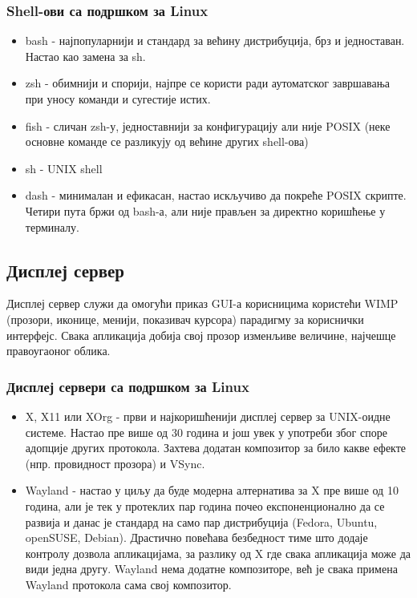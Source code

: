 \documentclass[a4paper,14pt]{article}
\begin{document}
\subsubsection{Shell-ови са подршком за Linux}
\begin{itemize}
\item bash - најпопуларнији и стандард за већину дистрибуција, брз и једноставан. Настао као замена за sh.
\item zsh - обимнији и спорији, најпре се користи ради аутоматског завршавања при уносу команди и сугестије истих.
\item fish - сличан zsh-у, једноставнији за конфигурацију али није POSIX (неке основне команде се разликују од већине других shell-ова)
\item sh - UNIX shell
\item dash - минималан и ефикасан, настао искључиво да покреће POSIX скрипте. Четири пута бржи од bash-а, али није прављен за директно коришћење у терминалу.
\end{itemize}

\subsection{Дисплеј сервер}
Дисплеј сервер служи да омогући приказ GUI-а корисницима користећи WIMP (прозори, иконице, менији, показивач курсора) парадигму за кориснички интерфејс. Свака апликација добија свој прозор изменљиве величине, најчешце правоугаоног облика.
\subsubsection{Дисплеј сервери са подршком за Linux}
\begin{itemize}
\item X, X11 или XOrg - први и најкоришћенији дисплеј сервер за UNIX-оидне системе. Настао пре више од 30 година и још увек у употреби због споре адопције других протокола. Захтева додатан композитор за било какве ефекте (нпр. провидност прозора) и VSync.
\item Wayland - настао у циљу да буде модерна алтернатива за X пре више од 10 година, али је тек у протеклих пар година почео експоненционално да се развија и данас је стандард на само пар дистрибуција (Fedora, Ubuntu, openSUSE, Debian). Драстично повећава безбедност тиме што додаје контролу дозвола апликацијама, за разлику од X где свака апликација може да види једна другу. Wayland нема додатне композиторе, већ је свака примена Wayland протокола сама свој композитор.
\end{itemize}
\newpage
\end{document}
